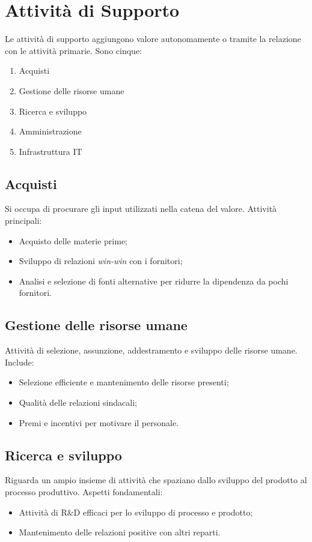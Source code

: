 \documentclass[a4paper,12pt]{article}
\begin{document}
\section{Attività di Supporto}
Le attività di supporto aggiungono valore autonomamente o tramite la relazione con le attività primarie.  
Sono cinque:
\begin{enumerate}
    \item Acquisti
    \item Gestione delle risorse umane
    \item Ricerca e sviluppo
    \item Amministrazione
    \item Infrastruttura IT
\end{enumerate}

\subsection{Acquisti}
Si occupa di procurare gli input utilizzati nella catena del valore.  
Attività principali:
\begin{itemize}
    \item Acquisto delle materie prime;
    \item Sviluppo di relazioni \emph{win-win} con i fornitori;
    \item Analisi e selezione di fonti alternative per ridurre la dipendenza da pochi fornitori.
\end{itemize}

\subsection{Gestione delle risorse umane}
Attività di selezione, assunzione, addestramento e sviluppo delle risorse umane.  
Include:
\begin{itemize}
    \item Selezione efficiente e mantenimento delle risorse presenti;
    \item Qualità delle relazioni sindacali;
    \item Premi e incentivi per motivare il personale.
\end{itemize}

\subsection{Ricerca e sviluppo}
Riguarda un ampio insieme di attività che spaziano dallo sviluppo del prodotto al processo produttivo.  
Aspetti fondamentali:
\begin{itemize}
    \item Attività di R\&D efficaci per lo sviluppo di processo e prodotto;
    \item Mantenimento delle relazioni positive con altri reparti.
\end{itemize}
\end{document}

